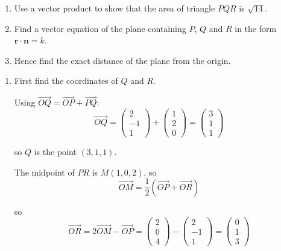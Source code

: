 \documentclass[leqno]{article}
\begin{document}
\begin{enumerate}[
  label=\textbf{\arabic*.},
  leftmargin=*,
  topsep=0pt,
  partopsep=0pt,
  parsep=0pt
]
\begin{enumerate}[label=\textbf{(\alph*)}]
  \item Use a vector product to show that the area of triangle $PQR$ is $\sqrt{14}$.  \\
  \item Find a vector equation of the plane containing $P$, $Q$ and $R$ in the form $\mathbf{r} \cdot \mathbf{n} = k$.  \\
  \item Hence find the exact distance of the plane from the origin.  \\
\end{enumerate}

\vspace*{10pt}

\begin{djsSolution}
\begin{enumerate}[label=\textbf{(\alph*)}]
  \item First find the coordinates of $Q$ and $R$.

  Using $\overrightarrow{OQ}=\overrightarrow{OP}+\overrightarrow{PQ}$:
  \[
  \overrightarrow{OQ}=\begin{pmatrix}2\\-1\\1\end{pmatrix}+\begin{pmatrix}1\\2\\0\end{pmatrix}=\begin{pmatrix}3\\1\\1\end{pmatrix}
  \]

  so $Q$ is the point $(3,1,1)$.

  The midpoint of $PR$ is $M(1,0,2)$, so
  \[
  \overrightarrow{OM}=\frac{1}{2}\left(\overrightarrow{OP}+\overrightarrow{OR}\right)
  \]

  so
  \[
  \overrightarrow{OR}=2\overrightarrow{OM}-\overrightarrow{OP}=\begin{pmatrix}2\\0\\4\end{pmatrix}-\begin{pmatrix}2\\-1\\1\end{pmatrix}=\begin{pmatrix}0\\1\\3\end{pmatrix}
  \]


\end{enumerate}
\end{djsSolution}
\end{enumerate}
\end{document}
